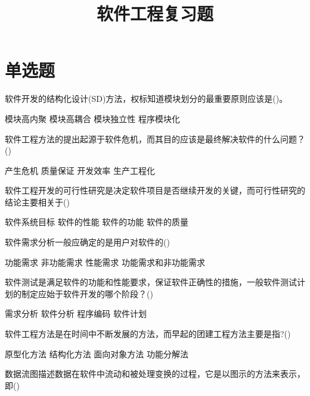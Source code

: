 \documentclass[answers]{exam}
\title{软件工程复习题}
\author{}
\date{}
\begin{document}
\maketitle
\section{单选题}
\begin{questions}
	\question 软件开发的结构化设计(SD)方法，权标知道模块划分的最重要原则应该是()。\\
	\begin{oneparchoices}
		\choice 模块高内聚
		\choice 模块高耦合
		\correctchoice 模块独立性
		\choice 程序模块化
	\end{oneparchoices}
	\question 软件工程方法的提出起源于软件危机，而其目的应该是最终解决软件的什么问题？()\\
	\begin{oneparchoices}
		\choice 产生危机
		\choice 质量保证
		\choice 开发效率
		\correctchoice 生产工程化
	\end{oneparchoices}
	\question 软件工程开发的可行性研究是决定软件项目是否继续开发的关键，而可行性研究的结论主要相关于()\\
	\begin{oneparchoices}
		\correctchoice 软件系统目标
		\choice 软件的性能
		\choice 软件的功能
		\choice 软件的质量
	\end{oneparchoices}
	\question 软件需求分析一般应确定的是用户对软件的()\\
	\begin{oneparchoices}
		\choice 功能需求
		\choice 非功能需求
		\choice 性能需求
		\correctchoice 功能需求和非功能需求
	\end{oneparchoices}
	\question 软件测试是满足软件的功能和性能要求，保证软件正确性的措施，一般软件测试计划的制定应始于软件开发的哪个阶段？()\\
	\begin{oneparchoices}
		\correctchoice 需求分析
		\choice 软件分析
		\choice 程序编码
		\choice 软件计划
	\end{oneparchoices}
	\question 软件工程方法是在时间中不断发展的方法，而早起的团建工程方法主要是指?()\\
	\begin{oneparchoices}
		\choice 原型化方法
		\correctchoice 结构化方法
		\choice 面向对象方法
		\choice 功能分解法
	\end{oneparchoices}
	\question 数据流图描述数据在软件中流动和被处理变换的过程，它是以图示的方法来表示，即()\\
	\begin{oneparchoices}

\end{oneparchoices}
\end{questions}
\end{document}
